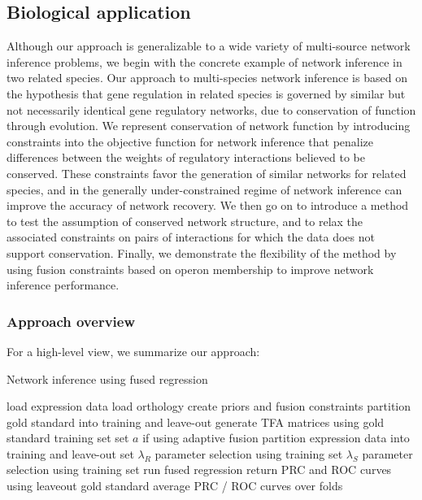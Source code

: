 \documentclass[11pt]{article}
\begin{document}
\subsection{Biological application}
Although our approach is generalizable to a wide variety of multi-source network inference problems, we begin with the concrete example of network inference in two related species. 
Our approach to multi-species network inference is based on the hypothesis that gene regulation in related species is governed by similar but not necessarily identical gene regulatory networks, due to conservation of function through evolution. 
We represent conservation of network function by introducing constraints into the objective function for network inference that penalize differences between the weights of regulatory interactions believed to be conserved. 
These constraints favor the generation of similar networks for related species, and in the generally under-constrained regime of network inference can improve the accuracy of network recovery. 
We then go on to introduce a method to test the assumption of conserved network structure, and to relax the associated constraints on pairs of interactions for which the data does not support conservation. Finally, we demonstrate the flexibility of the method by using fusion constraints based on operon membership to improve network inference performance. 


\subsubsection{Approach overview}
For a high-level view, we summarize our approach:

\begin{algorithm}
	\caption{Network inference using fused regression}\label{euclid}
	\begin{algorithmic}
\State load expression data
\State load orthology
\State create priors and fusion constraints
\State partition gold standard into training and leave-out
\State generate TFA matrices using gold standard training set
\State set $a$ if using adaptive fusion
	\State partition expression data into training and leave-out set
	\State $\lambda_R$ parameter selection using training set
	\State $\lambda_S$ parameter selection using training set
	\State run fused regression
	\State return PRC and ROC curves using leaveout gold standard
	\EndFor
\State average PRC / ROC curves over folds
\EndProcedure
\end{algorithmic}
\end{algorithm}
\end{document}
